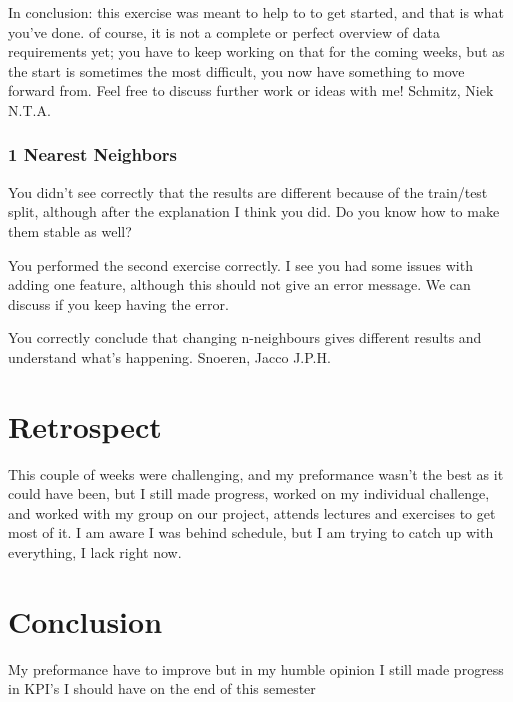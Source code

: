 \documentclass[a4paper, 11pt]{article}
\begin{document}
In conclusion: this exercise was meant to help to to get started, and that is what you've done. of course, it is not a complete or perfect overview of data requirements yet; you have to keep working on that for the coming weeks, but as the start is sometimes the most difficult, you now have something to move forward from. Feel free to discuss further work or ideas with me!
\smallbreak
Schmitz, Niek N.T.A.

\subsubsection{1 Nearest Neighbors}
You didn't see correctly that the results are different because of the train/test split, although after the explanation I think you did. Do you know how to make them stable as well?

You performed the second exercise correctly. I see you had some issues with adding one feature, although this should not give an error message. We can discuss if you keep having the error.

You correctly conclude that changing n-neighbours gives different results and understand what's happening.
\smallbreak
Snoeren, Jacco J.P.H.

\section{Retrospect}
This couple of weeks were challenging, and my preformance wasn't the best as it could have been, but I still made progress, worked on my individual challenge, and worked with my group on our project, attends lectures and exercises to get most of it. I am aware I was behind schedule, but I am trying to catch up with everything, I lack right now.
\section{Conclusion}
My preformance have to improve but in my humble opinion I still made progress in KPI's I should have on the end of this semester 
\end{document}
